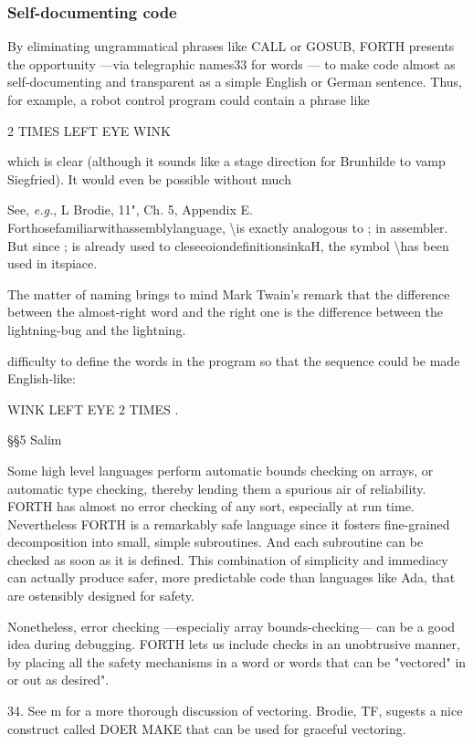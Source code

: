 \subsubsection{Self-documenting code}
By eliminating ungrammatical phrases like CALL or GOSUB,
FORTH presents the opportunity —via telegraphic names33 for
words — to make code almost as self-documenting and
transparent as a simple English or German sentence. Thus, for
example, a robot control program could contain a phrase like

2 TIMES LEFT EYE WINK

which is clear (although it sounds like a stage direction for Brunhilde to vamp Siegfried). It would even be possible without much

See, \textit{e.g.}, L Brodie, 11", Ch. 5, Appendix E.
Forthosefamiliarwithassemblylanguage, \textbackslash is exactly analogous to ; in assembler. But since ; is already used to cleseeoiondefinitionsinkaH, the symbol \textbackslash has been used in itspiace.

The matter of naming brings to mind Mark Twain's remark that the difference between the almost-right word and the right one is the difference between the lightning-bug and the lightning.

difficulty to define the words in the program so that the sequence could be made English-like:

WINK LEFT EYE 2 TIMES .

§§5 Salim

Some high level languages perform automatic bounds checking on arrays, or automatic type checking, thereby lending them a spurious air of reliability. FORTH has almost no error checking
of any sort, especially at run time. Nevertheless FORTH is a remarkably safe language since it fosters fine-grained decomposition into small, simple subroutines. And each subroutine can be checked as soon as it is defined. This combination of simplicity and immediacy can actually produce safer, more predictable code than languages like Ada, that are ostensibly designed for safety.

Nonetheless, error checking —especialiy array bounds-checking— can be a good idea during debugging. FORTH lets us include checks in an unobtrusive manner, by placing all the safety
mechanisms in a word or words that can be "vectored" in or out as desired".

 

34. See m for a more thorough discussion of vectoring. Brodie, TF, sugests a nice construct called DOER MAKE that can be used for graceful vectoring.